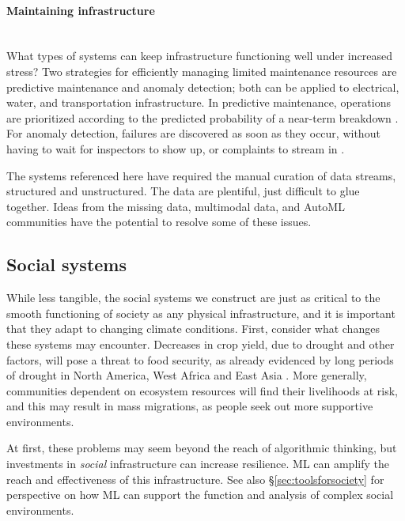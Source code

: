 \documentclass[11pt]{report}
\newcommand{\Gap}{\texorpdfstring{\hfill}{}}
\newcommand{\Rec}{\texorpdfstring{{\small\emph{\color{blue}{\fbox{High Leverage}}}}}{}}
\begin{document}
\paragraph*{Maintaining infrastructure}\Gap\textbf{\Rec}\mbox{}\\ What types of systems can keep infrastructure functioning
well under increased stress? Two strategies for efficiently managing limited
maintenance resources are predictive maintenance and anomaly detection;
both can be applied to electrical, water, and transportation
infrastructure. In predictive maintenance, operations are prioritized according
to the predicted probability of a near-term breakdown \cite{rudin2012machine,
nguyen2018automatic, srivastava2018design, dragomir2009review}. For anomaly detection, failures are discovered as soon as
they occur, without having to wait for inspectors to show up, or complaints to
stream in \cite{baig2011use, difallah2013scalable}. 

The systems referenced here have required the manual curation of data streams,
structured and unstructured. The data are plentiful, just difficult to glue
together. Ideas from the missing data, multimodal data, and AutoML communities
have the potential to resolve some of these issues.

\subsection{Social systems}
\label{subsub:social_systems}

While less tangible, the social systems we construct are just as critical to the
smooth functioning of society as any physical infrastructure, and it is
important that they adapt to changing climate conditions. First, consider
what changes these systems may encounter. Decreases in crop yield, due to drought and other factors, will pose a threat to food
security, as already evidenced by long periods of drought in North America, West
Africa and East Asia \cite{ipcc_foodsec, dai2011drought}. More generally, communities
dependent on ecosystem resources will find their livelihoods at risk, and this
may result in mass migrations, as people seek out more supportive environments.

At first, these problems may seem beyond the reach of algorithmic thinking,
but investments in \textit{social} infrastructure can increase
resilience. ML can amplify the reach and effectiveness of this infrastructure. See also \S{\ref{sec:toolsforsociety}} for
perspective on how ML can support the function and analysis of complex
social environments.
\end{document}
